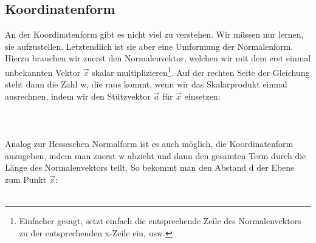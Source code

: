 	\subsection{Koordinatenform}
		An der Koordinatenform gibt es nicht viel zu verstehen. Wir müssen nur lernen,
		sie aufzustellen. Letztendlich ist sie aber eine Umformung der Normalenform.
		Hierzu brauchen wir zuerst den Normalenvektor, welchen wir mit dem erst einmal
		unbekannten Vektor \(\vec{x}\) skalar multiplizieren\footnote{Einfacher
		gesagt, setzt einfach die entsprechende Zeile des Normalenvektors zu der
		entsprechenden x-Zeile ein, usw.}. Auf der rechten Seite der Gleichung steht
		dann die Zahl w, die raus kommt, wenn wir das Skalarprodukt einmal ausrechnen,
		indem wir den Stützvektor \(\vec{a}\) für \(\vec{x}\) einsetzen:
		\\ \\
		\formel{\[n_1x_1+n_2x_2+n_3x_3=w \mathrm{\ (anders\ geschrieben\ }
		\vec{n}\cdot \vec{x}=w)\]}
		\\ \\
		Analog zur Hesseschen Normalform ist es auch möglich, die
		Koordinatenform anzugeben, indem man zuerst w abzieht und dann den gesamten
		Term durch die Länge des Normalenvektors teilt. So bekommt man den Abstand d
		der Ebene zum Punkt \(\vec{x}\):
		\\ \\
		\formel{\[\frac{n_1x_1+n_2x_2+n_3x_3-w}{|\vec{n}|}=d\]}
